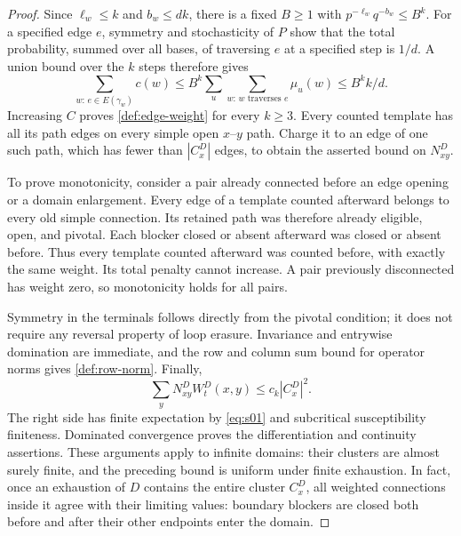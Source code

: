 \begin{proof}
Since $\ell_w\le k$ and $b_w\le dk$, there is a fixed $B\ge1$ with
$p^{-\ell_w}q^{-b_w}\le B^k$.  For a specified edge $e$, symmetry and
stochasticity of $P$ show that the total probability, summed over all
bases, of traversing $e$ at a specified step is $1/d$.  A union bound over
the $k$ steps therefore gives
\[
 \sum_{w:\,e\in E(\gamma_w)}c(w)
 \le B^k\sum_{u}\sum_{w:\,w\text{ traverses }e}\mu_u(w)
 \le B^k k/d.
\]
Increasing $C$ proves \eqref{def:edge-weight} for every $k\ge3$.
Every counted template has all its path edges on every simple open
$x$--$y$ path.  Charge it to an edge of one such path, which has fewer than
$|C_x^D|$ edges, to obtain the asserted bound on $N^D_{xy}$.

To prove monotonicity, consider a pair already connected before an edge
opening or a domain enlargement.  Every edge of a template counted
afterward belongs to every old simple connection.  Its retained path was
therefore already eligible, open, and pivotal.  Each blocker closed or
absent afterward was closed or absent before.  Thus every template counted
afterward was counted before, with exactly the same weight.  Its total
penalty cannot increase.  A pair previously disconnected has weight zero,
so monotonicity holds for all pairs.

Symmetry in the terminals follows directly from the pivotal condition;
it does not require any reversal property of loop erasure.  Invariance and
entrywise domination are immediate, and the row and column sum bound for
operator norms gives \eqref{def:row-norm}.
Finally,
\[
 \sum_y N^D_{xy}W_t^D(x,y)\le c_k|C_x^D|^2.
\]
The right side has finite expectation by \eqref{eq:s01} and subcritical
susceptibility finiteness.  Dominated convergence proves the differentiation
and continuity assertions.  These arguments apply to infinite domains:
their clusters are almost surely finite, and the preceding bound is
uniform under finite exhaustion.  In fact, once an exhaustion of $D$
contains the entire cluster $C_x^D$, all weighted connections inside it agree with their
limiting values: boundary blockers are closed both before and after their
other endpoints enter the domain.
\end{proof}

